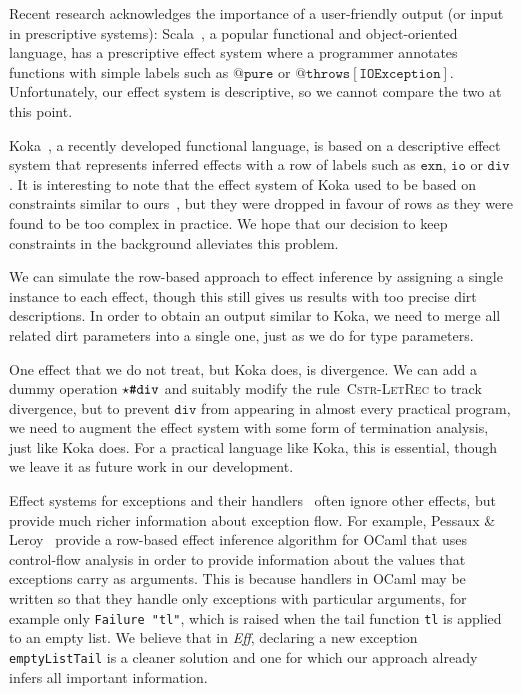 \documentclass{LMCS}
\newcommand{\rulename}[1]{{\mdseries \small \textsc{#1}}}
\newcommand{\kord}[1]{\mathtt{#1}}
\newcommand{\hash}[2]{#1\text{\texttt{\char35}}#2}
\newcommand{\Eff}{\emph{Eff}\xspace}
\let\inline\lstinline
\begin{document}
Recent research acknowledges the importance of a user-friendly output (or input in prescriptive systems):
Scala~\cite{rytz2012lightweight}, a popular functional and object-oriented language,
has a prescriptive effect system where a programmer annotates functions with simple labels such as $\kord{@pure}$ or $\kord{@throws[IOException]}$.
Unfortunately, our effect system is descriptive, so we cannot compare the two at this point.

Koka~\cite{leijen2014koka}, a recently developed functional language,
is based on a descriptive effect system that represents inferred effects with a row of labels such as $\kord{exn}$, $\kord{io}$ or $\kord{div}$.
It is interesting to note that the effect system of Koka used to be based on constraints similar to ours~\cite{tate2010convenient},
but they were dropped in favour of rows as they were found to be too complex in practice.
We hope that our decision to keep constraints in the background alleviates this problem.

We can simulate the row-based approach to effect inference by assigning a single instance to each effect,
though this still gives us results with too precise dirt descriptions.
In order to obtain an output similar to Koka,
we need to merge all related dirt parameters into a single one,
just as we do for type parameters.

One effect that we do not treat, but Koka does, is divergence.
We can add a dummy operation $\hash{\star}{\kord{div}}$ and suitably modify the rule~\rulename{Cstr-LetRec} to track divergence,
but to prevent $\kord{div}$ from appearing in almost every practical program,
we need to augment the effect system with some form of termination analysis, just like Koka does.
For a practical language like Koka, this is essential,
though we leave it as future work in our development.

Effect systems for exceptions and their handlers~\cite{fahndrich1997program, leroy2000type, yi2002cost} often ignore other effects,
but provide much richer information about exception flow.
For example, Pessaux \& Leroy~\cite{leroy2000type} provide a row-based effect inference algorithm for OCaml
that uses control-flow analysis
in order to provide information about the values that exceptions carry as arguments.
This is because handlers in OCaml may be written so that they handle only exceptions with particular arguments,
for example only \inline{Failure "tl"}, which is raised when the tail function \inline{tl} is applied to an empty list.
We believe that in \Eff, declaring a new exception \inline{emptyListTail} is a cleaner solution
and one for which our approach already infers all important information.
\end{document}
